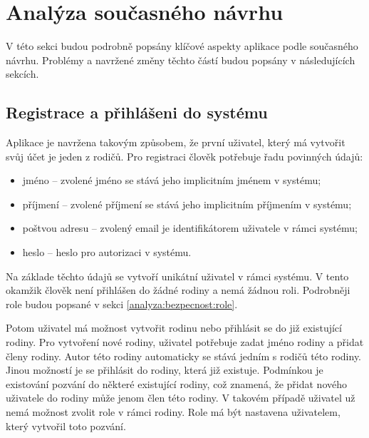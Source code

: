 \section{Analýza současného návrhu} \label{analyza:analyza navrhu}
    V této sekci budou podrobně popsány klíčové aspekty aplikace podle současného návrhu. Problémy a navržené změny těchto částí budou popsány v následujících sekcích.

    \subsection{Registrace a přihlášeni do systému}
        Aplikace je navržena takovým způsobem, že první uživatel, který má vytvořit svůj účet je jeden z rodičů. Pro registraci člověk potřebuje řadu povinných údajů:
        \begin{itemize}
	        \item jméno -- zvolené jméno se stává jeho implicitním jménem v systému;
	        \item příjmení -- zvolené příjmení se stává jeho implicitním příjmením v systému;
	        \item poštvou adresu -- zvolený email je identifikátorem uživatele v rámci systému;
	        \item heslo -- heslo pro autorizaci v systému.
        \end{itemize}
        Na základe těchto údajů se vytvoří unikátní uživatel v rámci systému. V tento okamžik člověk není přihlášen do žádné rodiny a nemá žádnou roli. Podrobněji role budou popsané v sekci \ref{analyza:bezpecnost:role}.
        
        Potom uživatel má možnost vytvořit rodinu nebo přihlásit se do již existující rodiny. Pro vytvoření nové rodiny, uživatel potřebuje zadat jméno rodiny a přidat členy rodiny. Autor této rodiny automaticky se stává jedním s rodičů této rodiny. Jinou možností je se přihlásit do rodiny, která již existuje. Podmínkou je existování pozvání do některé existující rodiny, což znamená, že přidat nového uživatele do rodiny může jenom člen této rodiny. V takovém případě uživatel už nemá možnost zvolit role v rámci rodiny. Role má být nastavena uživatelem, který vytvořil toto pozvání.


